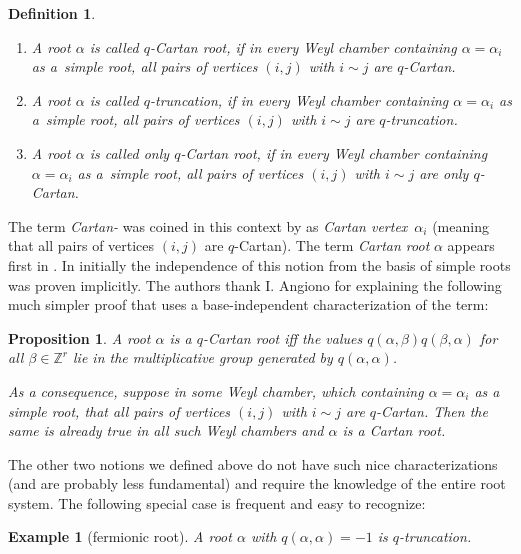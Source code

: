 \documentclass[10pt,a4paper]{amsart}
\numberwithin{equation}{section}
\newtheorem{prop}[teo]{Proposition}
\newtheorem{defin}[teo]{Definition}
\newtheorem{ese}[teo]{Example}
\newcommand{\Z}{\mathbb{Z}}
\begin{document}
\begin{defin} \label{def_qCartanRoot}\quad
\begin{enumerate}\itemsep=0pt
	\item A root $\alpha$ is called \emph{$q$-Cartan root}, if in every Weyl chamber containing $\alpha=\alpha_i$ as a~simple root, all pairs of vertices $(i,j)$ with $i\sim j$ are $q$-Cartan.
	\item A root $\alpha$ is called \emph{$q$-truncation}, if in every Weyl chamber containing $\alpha=\alpha_i$ as a~simple root, all pairs of vertices $(i,j)$ with $i\sim j$ are $q$-truncation.
	\item A root $\alpha$ is called \emph{only $q$-Cartan root}, if in every Weyl chamber containing $\alpha=\alpha_i$ as a~simple root, all pairs of vertices $(i,j)$ with $i\sim j$ are only $q$-Cartan.
\end{enumerate}
\end{defin}
The term \emph{Cartan-} was coined in this context by \cite{Ang13} as \emph{Cartan vertex}~$\alpha_i$ (meaning that all pairs of vertices $(i,j)$ are $q$-Cartan). The term \emph{Cartan root} $\alpha$ appears first in \cite{Ang16}. In \cite{AAR19} initially the independence of this notion from the basis of simple roots was proven implicitly. The authors thank I. Angiono for explaining the following much simpler proof that uses a base-independent characterization of the term: 	
\begin{prop}\label{prop_IvanCartanRoot} A root
	$\alpha$ is a $q$-Cartan root iff the values $q(\alpha,\beta)q(\beta,\alpha)$ for all $\beta\in\Z^r$ lie in the multiplicative group generated by $q(\alpha,\alpha)$.
	
	As a consequence, suppose in some Weyl chamber, which containing $\alpha=\alpha_i$ as a simple root, that all pairs of vertices $(i,j)$ with $i\sim j$ are $q$-Cartan. Then the same is already true in all such Weyl chambers and $\alpha$ is a Cartan root.
\end{prop}
The other two notions we defined above do not have such nice characterizations (and are probably less fundamental) and require the knowledge of the entire root system. The following special case is frequent and easy to recognize:
\begin{ese}[fermionic root]
	A root $\alpha$ with $q(\alpha,\alpha)=-1$ is $q$-truncation.
\end{ese}
\end{document}
